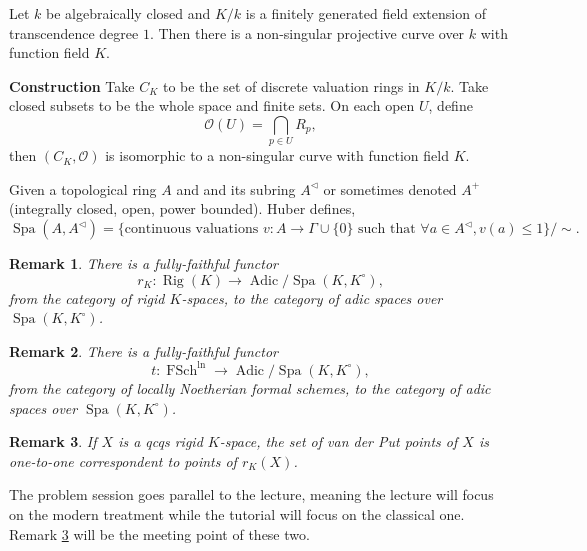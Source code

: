 \documentclass[10pt]{article}
\numberwithin{equation}{section}
\newtheorem{remark}{Remark}[section]
\DeclareMathOperator{\Spa}{Spa}
\DeclareMathOperator{\Rig}{Rig}
\DeclareMathOperator{\Adic}{Adic}
\DeclareMathOperator{\FSch}{FSch}
\newcommand{\Ouv}{\mathcal{O}}
\begin{document}
Let $k$ be algebraically closed and $K/k$ is a finitely generated field extension of transcendence degree $1$. Then there is a non-singular projective curve over $k$ with 
function field $K$. 
\par\textbf{Construction}
Take $C_K$ to be the set of discrete valuation rings in $K/k$. Take closed subsets to be the whole space and finite sets.
On each open $U$, define 
\begin{equation*}
  \Ouv(U) = \bigcap_{p\in U}R_p,
\end{equation*}
then $(C_K,\Ouv)$ is isomorphic to a non-singular curve with function field $K$.
\par Given a topological ring $A$ and and its subring $A^\triangleleft$ or sometimes denoted $A^+$(integrally closed, open, power bounded). Huber defines,
\begin{equation*}
  \Spa(A,A^\triangleleft) = \{\text{continuous valuations $v:A\to \Gamma\cup\{0\}$ such that $\forall a\in A^\triangleleft, v(a)\leq1$}\}/\sim.
\end{equation*}
\begin{remark}  There is a fully-faithful functor 
  \begin{equation*}
    r_K:\Rig(K)\to \Adic/\Spa(K,K^\circ),
  \end{equation*}
  from the category of rigid $K$-spaces, to the category of adic spaces over $\Spa(K,K^\circ)$.
\end{remark}
\begin{remark}  There is a fully-faithful functor 
  \begin{equation*}
    t:\FSch^{\text{ln}}\to \Adic/\Spa(K,K^\circ),
  \end{equation*}
  from the category of locally Noetherian formal schemes, to the category of adic spaces over $\Spa(K,K^\circ)$.
\end{remark}
\begin{remark}
  \label{remark_2_classical_modern_intersection}
  If $X$ is a qcqs rigid $K$-space, the set of van der Put points of $X$ is one-to-one correspondent to points of $r_K(X)$.
\end{remark}
The problem session goes parallel to the lecture, meaning the lecture will focus on the modern treatment while the tutorial will focus on the classical one. Remark \ref{remark_2_classical_modern_intersection} will be the meeting point of these two.
\end{document}
